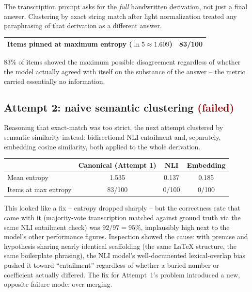\documentclass[11pt]{article}
\newcommand{\failed}[1]{\textcolor{darkred}{\textbf{#1}}}
\begin{document}
The transcription prompt asks for the \emph{full} handwritten derivation, not
just a final answer. Clustering by exact string match after light
normalization treated any paraphrasing of that derivation as a different
answer.

\begin{center}
\begin{tabular}{lc}
\toprule
Items pinned at maximum entropy ($\ln 5 \approx 1.609$) & 83/100 \\
\bottomrule
\end{tabular}
\end{center}

83\% of items showed the maximum possible disagreement regardless of whether
the model actually agreed with itself on the substance of the answer --
the metric carried essentially no information.

\subsection{Attempt 2: naive semantic clustering \failed{(failed)}}

Reasoning that exact-match was too strict, the next attempt clustered by
semantic similarity instead: bidirectional NLI entailment and, separately,
embedding cosine similarity, both applied to the whole derivation.

\begin{center}
\begin{tabular}{lccc}
\toprule
 & Canonical (Attempt 1) & NLI & Embedding \\
\midrule
Mean entropy & 1.535 & 0.137 & 0.185 \\
Items at max entropy & 83/100 & 0/100 & 0/100 \\
\bottomrule
\end{tabular}
\end{center}

This looked like a fix -- entropy dropped sharply -- but the correctness rate
that came with it (majority-vote transcription matched against ground truth
via the same NLI entailment check) was $92/97 = 95\%$, implausibly high next
to the model's other performance figures. Inspection showed the cause: with
premise and hypothesis sharing nearly identical scaffolding (the same LaTeX
structure, the same boilerplate phrasing), the NLI model's well-documented
lexical-overlap bias pushed it toward ``entailment'' regardless of whether a
buried number or coefficient actually differed. The fix for Attempt~1's
problem introduced a new, opposite failure mode: over-merging.
\end{document}
